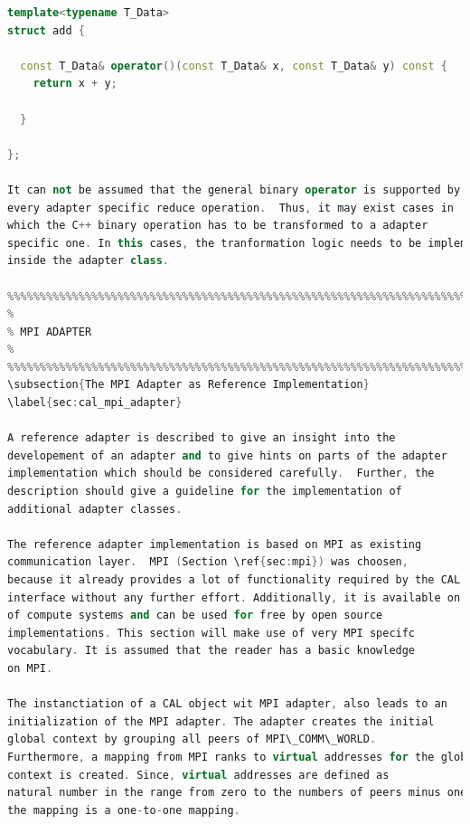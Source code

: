 \begin{lstlisting}[language=C++, breaklines=false, label={lst:binary_function}]
template<typename T_Data>
struct add {

  const T_Data& operator()(const T_Data& x, const T_Data& y) const {
    return x + y;

  }

};

It can not be assumed that the general binary operator is supported by
every adapter specific reduce operation.  Thus, it may exist cases in
which the C++ binary operation has to be transformed to a adapter
specific one. In this cases, the tranformation logic needs to be implemented
inside the adapter class.

%%%%%%%%%%%%%%%%%%%%%%%%%%%%%%%%%%%%%%%%%%%%%%%%%%%%%%%%%%%%%%%%%%%%%%%%%%%%%%%%
%                                                                              %
% MPI ADAPTER                                                                  %
%                                                                              %
%%%%%%%%%%%%%%%%%%%%%%%%%%%%%%%%%%%%%%%%%%%%%%%%%%%%%%%%%%%%%%%%%%%%%%%%%%%%%%%%
\subsection{The MPI Adapter as Reference Implementation}
\label{sec:cal_mpi_adapter}

A reference adapter is described to give an insight into the
developement of an adapter and to give hints on parts of the adapter
implementation which should be considered carefully.  Further, the
description should give a guideline for the implementation of
additional adapter classes.

The reference adapter implementation is based on MPI as existing
communication layer.  MPI (Section \ref{sec:mpi}) was choosen,
because it already provides a lot of functionality required by the CAL
interface without any further effort. Additionally, it is available on wide range
of compute systems and can be used for free by open source
implementations. This section will make use of very MPI specifc 
vocabulary. It is assumed that the reader has a basic knowledge
on MPI.

The instanctiation of a CAL object wit MPI adapter, also leads to an
initialization of the MPI adapter. The adapter creates the initial
global context by grouping all peers of MPI\_COMM\_WORLD.
Furthermore, a mapping from MPI ranks to virtual addresses for the global
context is created. Since, virtual addresses are defined as
natural number in the range from zero to the numbers of peers minus one,
the mapping is a one-to-one mapping.


\end{lstlisting}
